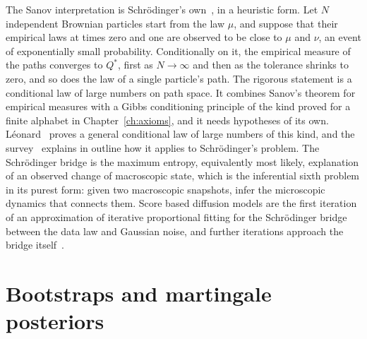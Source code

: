 The Sanov interpretation is Schr\"odinger's own~\cite{schrodinger1931}, in a heuristic form. Let $N$ independent Brownian particles start from the law $\mu$, and suppose that their empirical laws at times zero and one are observed to be close to $\mu$ and $\nu$, an event of exponentially small probability. Conditionally on it, the empirical measure of the paths converges to $Q^*$, first as $N\to\infty$ and then as the tolerance shrinks to zero, and so does the law of a single particle's path. The rigorous statement is a conditional law of large numbers on path space. It combines Sanov's theorem for empirical measures with a Gibbs conditioning principle of the kind proved for a finite alphabet in Chapter~\ref{ch:axioms}, and it needs hypotheses of its own. L\'eonard~\cite[Theorem~7.1]{leonard2010} proves a general conditional law of large numbers of this kind, and the survey~\cite[Section~6]{leonard2014} explains in outline how it applies to Schr\"odinger's problem. The Schr\"odinger bridge is the maximum entropy, equivalently most likely, explanation of an observed change of macroscopic state, which is the inferential sixth problem in its purest form: given two macroscopic snapshots, infer the microscopic dynamics that connects them. Score based diffusion models are the first iteration of an approximation of iterative proportional fitting for the Schr\"odinger bridge between the data law and Gaussian noise, and further iterations approach the bridge itself~\cite{debortoli2021}.

\section{Bootstraps and martingale posteriors}

